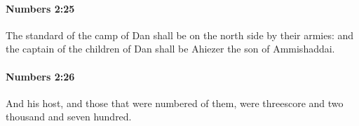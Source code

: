 		\paragraph{Numbers 2:25} %
			\label{NUMBERS-2-25}

			The standard of the camp of Dan shall be on the north side by their armies: and the captain of the children of Dan shall be Ahiezer the son of Ammishaddai.


		\paragraph{Numbers 2:26} %
			\label{NUMBERS-2-26}

			And his host, and those that were numbered of them, were threescore and two thousand and seven hundred.


